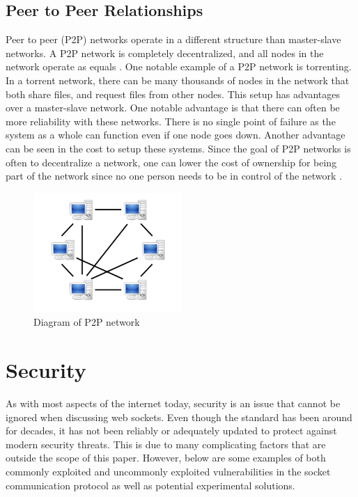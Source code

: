 \documentclass[conference, 12pt]{IEEEtran}
\begin{document}
\subsection{Peer to Peer Relationships}
Peer to peer (P2P) networks operate in a different structure than master-slave networks. A P2P network is completely decentralized, and all nodes in the network operate as equals \cite{milojicic2002peer}. One notable example of a P2P network is torrenting. In a torrent network, there can be many thousands of nodes in the network that both share files, and request files from other nodes. This setup has advantages over a master-slave network. One notable advantage is that there can often be more reliability with these networks. There is no single point of failure as the system as a whole can function even if one node goes down. Another advantage can be seen in the cost to setup these systems. Since the goal of P2P networks is often to decentralize a network, one can lower the cost of ownership for being part of the network since no one person needs to be in control of the network \cite{milojicic2002peer}.
\begin{figure}[H]
    \centering
    \centerline{\includegraphics[width=0.5\textwidth]{Figure2.png}}
    \caption{Diagram of P2P network \cite{bieg_2007}}
    \label{Figure2}
\end{figure}

\section{Security}
As with most aspects of the internet today, security is an issue that cannot be ignored when discussing web sockets. Even though the standard has been around for decades, it has not been reliably or adequately updated to protect against modern security threats. This is due to many complicating factors that are outside the scope of this paper. However, below are some examples of both commonly exploited and uncommonly exploited vulnerabilities in the socket communication protocol as well as potential experimental solutions.
\end{document}
